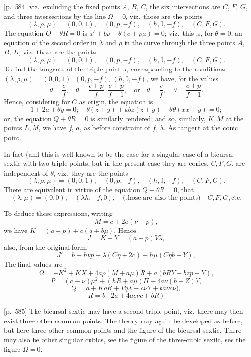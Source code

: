 \documentclass[11pt,a4paper]{book}
\begin{document}
[p.~584] viz.\ excluding the fixed points $A$, $B$, $C$, the six intersections are $C$, $F$, $G$, and three intersections by the line $\Omega = 0$, viz.\ those are the points
\[
(\lambda, \rho, \mu) = (0, 0, 1), \quad (0, p, -f), \quad (h, 0, -f), \quad (C, F, G).
\]
The equation $Q + \theta R = 0$ is $a' + b\rho + \theta(c + \rho \mu) = 0$; viz.\ this is, for $\theta = 0$, an equation of the second order in $\lambda$ and $\rho$ in the curve through the three points $A$, $B$, $H$, viz.\ those are the points
\[
(\lambda, \rho, \mu) = (0, 0, 1), \quad (0, p, -f), \quad (h, 0, -f), \quad (C, F, G).
\]
To find the tangents at the triple point $J$, corresponding to the conditions $(\lambda, \rho, \mu) = (0, 0, 1)$, $(0, p, -f)$, $(h, 0, -f)$, we have, for the values
\[
\theta = \frac{c}{f}, \quad \theta = \frac{c + p}{f} \cdot \frac{c + p}{f - 1}, \quad \text{or}\quad \theta = \frac{c}{f}, \quad \theta = \frac{c + p}{f - 1}.
\]
Hence, considering for $C$ as origin, the equation is
\[
1 + 2a + \theta y = 0; \quad \theta(z + y) + a b z(z + y) + \theta\theta(x x + y) = 0;
\]
or, the equation $Q + \theta R = 0$ is similarly rendered; and so, similarly, $K, M$ at the points $L, M$, we have $f$, $a$, as before constraint of $f$, $h$. As tangent at the conic point.

In fact (and this is well known to be the case for a singular case of a bicursal sextic with two triple points, but in the present case they are conics, $C, F, G$, are independent of $\theta$, viz.\ they are the points
\[
(\lambda, \rho, \mu) = (0, 0, 1), \quad (0, p, -f), \quad (h, 0, -f), \quad (C, F, G).
\]
There are equivalent in virtue of the equation $Q + \theta R = 0$, that
\[
(\lambda, \mu) = (0, 0), \quad (\lambda h, -f, 0), \quad \text{(those are also the points)} \quad C, F, G, \text{etc.}
\]

To deduce these expressions, writing
\[
M = c + 2a(\nu + p),
\]
we have $K = (a + p) + c(a + b\mu)$. Hence
\[
J = K + Y = (a - p)V \lambda,
\]
also, from the original form,
\[
J' = b + h\nu p + \lambda(C\eta + 2c) - h\mu(C\eta b + Y),
\]
The final values are
\[
\Omega = -K^2 + KX + 4a\rho(M + a\mu)R + a(bRY - bzp + Y),
\]
\[
P = (a - \nu)\mu^2 + (h R + a\mu)\Pi - 4a\nu(b - Z)Y,
\]
\[
Q = a + KaR + Pq\lambda - a\nu Y + b a\nu c\nu),
\]
\[
R = b(2a + 4a c\nu c + b R)
\]

\bigskip

[p.~585] The bicursal sextic may have a second triple point, viz.\ there may then exist three other common points. The theory may again be developed as before, but here three other common points and the figure of the bicursal sextic. There may also be other singular cubics, see the figure of the three-cubic sextic, see the figure $\Omega = 0$.
\end{document}
